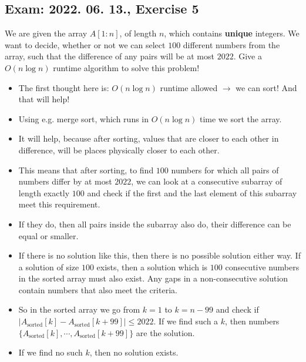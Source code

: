 \subsection{Exam: 2022. 06. 13., Exercise 5}


We are given the array $A[1:n]$, of length $n$, which contains \textbf{unique} integers. We want to decide, whether or not we can select $100$ different numbers from the array, such that the difference of any pairs will be at most $2022$. Give a $O(n \log n)$ runtime algorithm to solve this problem!


\begin{itemize}
    \item The first thought here is: $O(n \log n)$ runtime allowed $\rightarrow$ we can sort! And that will help!
    \item Using e.g. merge sort, which runs in $O(n \log n)$ time we sort the array.
    \item It will help, because after sorting, values that are closer to each other in difference, will be places physically closer to each other.
    \item This means that after sorting, to find $100$ numbers for which all pairs of numbers differ by at most $2022$, we can look at a consecutive subarray of length exactly $100$ and check if the first and the last element of this subarray meet this requirement.
    \item If they do, then all pairs inside the subarray also do, their difference can be equal or smaller.
    \item If there is no solution like this, then there is no possible solution either way. If a solution of size $100$ exists, then a solution which is $100$ consecutive numbers in the sorted array must also exist. Any gaps in a non-consecutive solution contain numbers that also meet the criteria.
    \item So in the sorted array we go from $k=1$ to $k=n-99$ and check if $|A_{\text{sorted}}[k] - A_{\text{sorted}}[k+99]| \leq{} 2022$. If we find such a $k$, then numbers $\{A_{\text{sorted}}[k], \cdots{}, A_{\text{sorted}}[k+99]\}$ are the solution.
    \item If we find no such $k$, then no solution exists.
\end{itemize}
